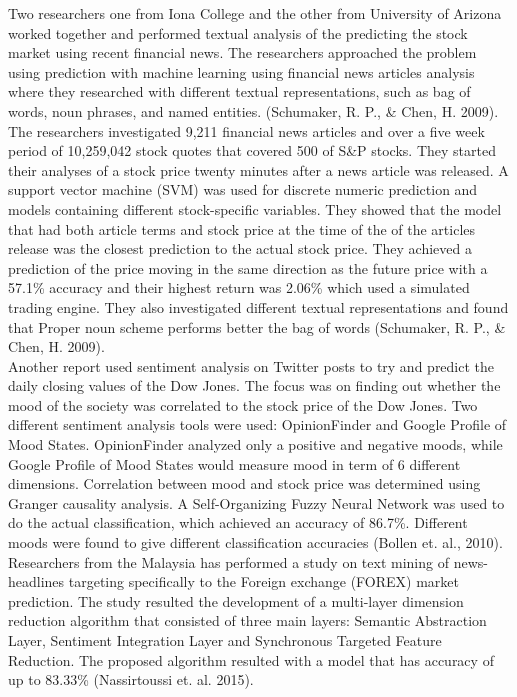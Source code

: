 \documentclass[11pt,a4paper]{article}
\begin{document}
Two researchers one from Iona College and the other from University of Arizona worked together and performed textual analysis of the predicting the stock market using recent financial news. The researchers approached the problem using prediction with machine learning using financial news articles analysis where they researched with different textual representations, such as bag of words, noun phrases, and named entities. (Schumaker, R. P., \& Chen, H. 2009).\\

The researchers investigated 9,211 financial news articles and over a five week period of 10,259,042 stock quotes that covered 500 of S\&P stocks. They started their analyses of a stock price twenty minutes after a news article was released. A support vector machine (SVM) was used for discrete numeric prediction and models containing different stock-specific variables. They showed that the model that had both article terms and stock price at the time of the of the articles release was the closest prediction to the actual stock price. They achieved a prediction of the price moving in the same direction as the future price with a 57.1\% accuracy and their highest return was 2.06\% which used a simulated trading engine. They also investigated different textual representations and found that Proper noun scheme performs better the bag of words (Schumaker, R. P., \& Chen, H. 2009).\\

Another report used sentiment analysis on Twitter posts to try and predict the daily closing values of the Dow Jones. The focus was on finding out whether the mood of the society was correlated to the stock price of the Dow Jones. Two different sentiment analysis tools were used: OpinionFinder and Google Profile of Mood States. OpinionFinder analyzed only a positive and negative moods, while Google Profile of Mood States would measure mood in term of 6 different dimensions. Correlation between mood and stock price was determined using Granger causality analysis. A Self-Organizing Fuzzy Neural Network was used to do the actual classification, which achieved an accuracy of 86.7\%. Different moods were found to give different classification accuracies (Bollen et. al., 2010).\\

Researchers from the Malaysia has performed a study on text mining of news-headlines targeting specifically to the Foreign exchange (FOREX) market prediction. The study resulted the development of a multi-layer dimension reduction algorithm that consisted of three main layers: Semantic Abstraction Layer, Sentiment Integration Layer and Synchronous Targeted Feature Reduction. The proposed algorithm resulted with a model that has accuracy of up to 83.33\% (Nassirtoussi et. al. 2015).\\
\end{document}
